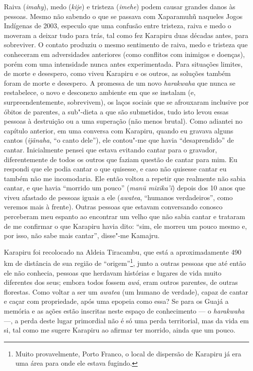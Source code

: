 Raiva (\emph{imahy}), medo (\emph{kije}) e tristeza (\emph{imehe}) podem
causar grandes danos às pessoas. Mesmo não sabendo o que se passava com
Xaparamuhũ naqueles Jogos Indígenas de 2003, especulo que uma confusão
entre tristeza, raiva e medo o moveram a deixar tudo para trás, tal como
fez Karapiru duas décadas antes, para sobreviver. O contato produziu o
mesmo sentimento de raiva, medo e tristeza que conheceram em
adversidades anteriores (como conflitos com inimigos e doenças), porém
com uma intensidade nunca antes experimentada. Para situações limites,
de morte e desespero, como viveu Karapiru e os outros, as soluções
também foram de morte e desespero. A promessa de um novo
\emph{harakwaha} que nunca se restabelece, o novo e desconexo ambiente
em que se instalam (e, surpreendentemente, sobrevivem), os laços sociais
que se afrouxaram inclusive por óbitos de parentes, a sub"-dieta a que
são submetidos, tudo isto levou essas pessoas à destruição ou a uma
superação (não menos brutal). Como adiantei no capítulo anterior, em uma
conversa com Karapiru, quando eu gravava alguns cantos (\emph{ijãnaha},
``o canto dele''), ele contou"-me que havia ``desaprendido'' de cantar.
Inicialmente pensei que estava evitando cantar para o gravador,
diferentemente de todos os outros que faziam questão de cantar para mim.
Eu respondi que ele podia cantar o que quisesse, e caso não quisesse
cantar eu também não me incomodaria. Ele então voltou a repetir que
realmente não sabia cantar, e que havia ``morrido um pouco'' (\emph{manũ
mixika'ĩ}) depois dos 10 anos que viveu afastado de pessoas iguais a ele
(\emph{awatea}, ``humanos verdadeiros'', como veremos mais à frente).
Outras pessoas que estavam conversando conosco perceberam meu espanto ao
encontrar um velho que não sabia cantar e trataram de me confirmar o que
Karapiru havia dito: ``sim, ele morreu um pouco mesmo e, por isso, não
sabe mais cantar'', disse"-me Kamajru.

Karapiru foi recolocado na Aldeia Tiracambu, que está a aproximadamente
490 km de distância de sua região de ``origem''\footnote{Muito
  provavelmente, Porto Franco, o local de dispersão de Karapiru já era
  uma área para onde ele estava fugindo.}, junto a outras pessoas que
até então ele não conhecia, pessoas que herdavam histórias e lugares de
vida muito diferentes dos seus; embora todos fossem \emph{awá}, eram
outros parentes, de outras florestas. Como voltar a ser um \emph{awatea}
(um humano de verdade), capaz de cantar e caçar com propriedade, após
uma epopeia como essa? Se para os Guajá a memória e as ações estão
inscritas neste espaço de conhecimento --- o \emph{harakwaha} ---, a perda
deste lugar primordial não é só uma perda territorial, mas da vida em
si, tal como me sugere Karapiru ao afirmar ter morrido, ainda que um
pouco.

